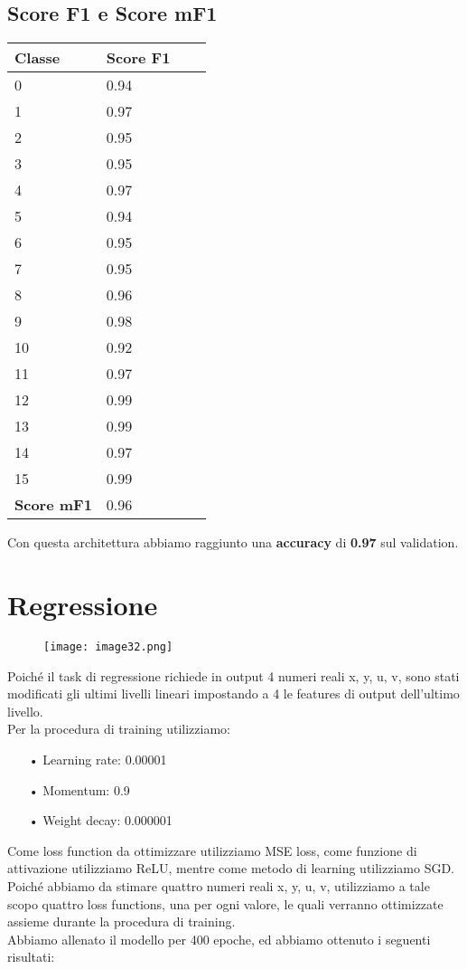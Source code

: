 \subsection{Score F1 e Score mF1}
\begin{center}
	\begin{tabular}{| l | l | l | l |}
		\hline
		Classe & Score F1 \\ \hline
		0 & 0.94 \\ \hline
		1 & 0.97 \\ \hline
		2 & 0.95 \\ \hline
		3 & 0.95 \\ \hline
		4 & 0.97 \\ \hline
		5 & 0.94 \\ \hline
		6 & 0.95 \\ \hline
		7 & 0.95 \\ \hline
		8 & 0.96 \\ \hline
		9 & 0.98 \\ \hline
		10 & 0.92 \\ \hline
		11 & 0.97 \\ \hline
		12 & 0.99 \\ \hline
		13 & 0.99 \\ \hline
		14 & 0.97 \\ \hline
		15 & 0.99 \\ \hline 
		{\bf Score mF1} & 0.96 \\ \hline							
	\end{tabular}
\end{center}
Con questa architettura abbiamo raggiunto una {\bf accuracy} di {\bf 0.97} sul validation.

\section{Regressione}
\begin{figure}[H]
	\centering
	\texttt{[image: image32.png]}
\end{figure}
Poiché il task di regressione richiede in output 4 numeri reali x, y, u, v, sono stati modificati gli ultimi livelli lineari impostando a 4 le features di output dell’ultimo livello. \\
Per la procedura di training utilizziamo: 
\begin{itemize}
	\item[•]Learning rate: 0.00001
	\item[•]Momentum: 0.9
	\item[•]Weight decay: 0.000001
\end{itemize}
Come loss function da ottimizzare utilizziamo MSE loss, come funzione di attivazione utilizziamo ReLU, mentre come metodo di learning utilizziamo SGD. \\
Poiché abbiamo da stimare quattro numeri reali x, y, u, v, utilizziamo a tale scopo quattro loss functions, una per ogni valore, le quali verranno ottimizzate assieme durante la procedura di training. \\
Abbiamo allenato il modello per 400 epoche, ed abbiamo ottenuto i seguenti risultati:

